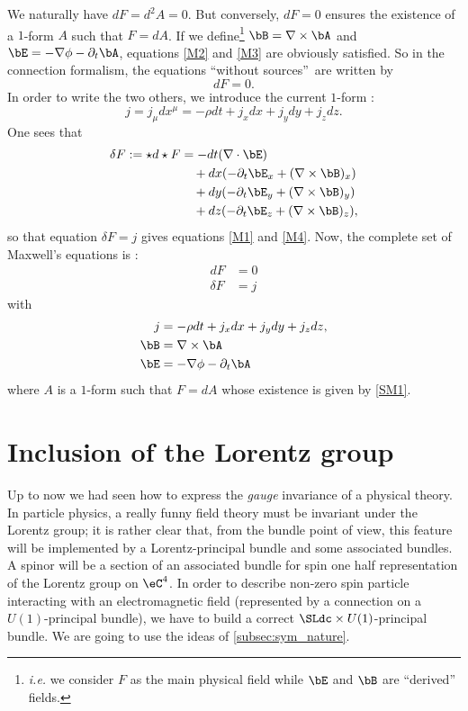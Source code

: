 We naturally have $dF=d^2A=0$. But conversely, $dF=0$ ensures the existence of a $1$-form $A$ such that $F=dA$. If we define\footnote{\emph{i.e.} we consider $F$ as the main physical field while $\bE$ and $\bB$ are ``derived'' fields.} $\bB=\nabla\times\bA$ and $\bE=-\nabla\phi-\partial_t\bA$, equations \eqref{M2} and \eqref{M3} are obviously satisfied. So in the connection formalism, the equations ``without sources''\ are written by
\begin{equation}\label{M23}
 dF=0.
\end{equation}
In order to write the two others, we introduce the current $1$-form :
\[
  j=j_{\mu}dx^{\mu}=-\rho dt+j_x dx+j_y dy+j_z dz.
\]
%
One sees that
\begin{equation}
\begin{split}
  \delta F:=\star d\star F&=-dt(\nabla\cdot\bE)\\
                &\quad+ dx(-\partial_t \bE_x+ (\nabla\times\bB)_x )\\
		&\quad+ dy(-\partial_t \bE_y+ (\nabla\times\bB)_y )\\
		&\quad+ dz(-\partial_t \bE_z+ (\nabla\times\bB)_z ),
\end{split}
\end{equation}
so that equation $\delta F=j$ gives equations \eqref{M1} and \eqref{M4}. Now, the complete set of Maxwell's equations is :
\begin{subequations}
\begin{align}
   d F&= 0\label{SM1}\\
   \delta F &=j\label{SM2}
\end{align}
\end{subequations}
with
\begin{subequations}
\begin{align}
j&=-\rho dt+j_x dx+j_y dy+j_z dz,\\
  \bB&=\nabla\times\bA\\
  \bE&=-\nabla\phi-\partial_t\bA
\end{align}
\end{subequations}
where $A$ is a $1$-form such that $F=dA$ whose existence is given by \eqref{SM1}.
\section{Inclusion of the Lorentz group}\label{subsec:incl_Lorentz}

Up to now we had seen how to express the \emph{gauge} invariance of a physical theory. In particle physics, a really funny field theory must be invariant under the Lorentz group; it is rather clear that, from the bundle point of view, this feature will be implemented by a Lorentz-principal bundle and some associated bundles. A spinor will be a section of an associated bundle for spin one half representation of the Lorentz group on $\eC^4$. In order to describe non-zero spin particle interacting with an electromagnetic field (represented by a connection on a $U(1)$-principal bundle), we have to build a correct $\SLdc\times U(1)$-principal bundle. We are going to use the ideas of \ref{subsec:sym_nature}.


